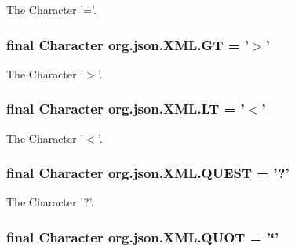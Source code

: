 The Character '='. \hypertarget{classorg_1_1json_1_1XML_a0a9f1aaef15f78d43c532e601546a722}{
\subsubsection[{G\-T}]{\setlength{\rightskip}{0pt plus 5cm}final Character org.\-json.\-X\-M\-L.\-G\-T = '$>$'\hspace{0.3cm}{\ttfamily [static]}}}\label{classorg_1_1json_1_1XML_a0a9f1aaef15f78d43c532e601546a722}
The Character '$>$'. \hypertarget{classorg_1_1json_1_1XML_a12c351d05c7c78c4730d1ec44ae6b798}{
\subsubsection[{L\-T}]{\setlength{\rightskip}{0pt plus 5cm}final Character org.\-json.\-X\-M\-L.\-L\-T = '$<$'\hspace{0.3cm}{\ttfamily [static]}}}\label{classorg_1_1json_1_1XML_a12c351d05c7c78c4730d1ec44ae6b798}
The Character '$<$'. \hypertarget{classorg_1_1json_1_1XML_a6ee91c7c64c44b62b197a69b00ee383f}{
\subsubsection[{Q\-U\-E\-S\-T}]{\setlength{\rightskip}{0pt plus 5cm}final Character org.\-json.\-X\-M\-L.\-Q\-U\-E\-S\-T = '?'\hspace{0.3cm}{\ttfamily [static]}}}\label{classorg_1_1json_1_1XML_a6ee91c7c64c44b62b197a69b00ee383f}
The Character '?'. \hypertarget{classorg_1_1json_1_1XML_a4a8e56f228505f24fd24b70914d5078c}{
\subsubsection[{Q\-U\-O\-T}]{\setlength{\rightskip}{0pt plus 5cm}final Character org.\-json.\-X\-M\-L.\-Q\-U\-O\-T = '\char`\"{}'\hspace{0.3cm}{\ttfamily [static]}}}\label{classorg_1_1json_1_1XML_a4a8e56f228505f24fd24b70914d5078c}
